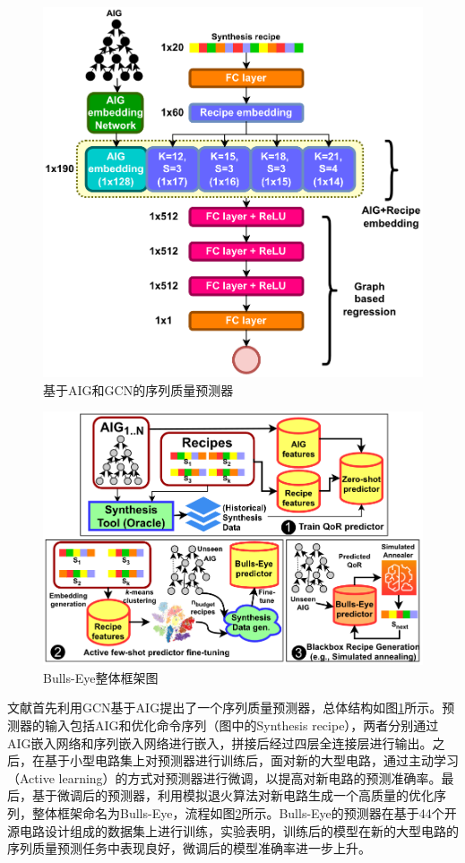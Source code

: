 \begin{figure}[!htbp]
    \centering
    \includegraphics[width=0.7\linewidth]{./figs/LS-Bulls-Eye-QoR_predictor.png}
    \caption{基于AIG和GCN的序列质量预测器}
    \label{LS:Bulls-Eye:Fig:QoR_predictor}
\end{figure}

\begin{figure}[!htbp]
    \centering
    \includegraphics[width=0.9\linewidth]{./figs/LS-Bulls-Eye-overall_framework.png}
    \caption{Bulls-Eye整体框架图}
    \label{LS:Bulls-Eye:Fig:overall_framework}
\end{figure}

文献\cite{LS:Bulls-Eye}首先利用GCN基于AIG提出了一个序列质量预测器，总体结构如图\ref{LS:Bulls-Eye:Fig:QoR_predictor}所示。预测器的输入包括AIG和优化命令序列（图中的Synthesis recipe），两者分别通过AIG嵌入网络和序列嵌入网络进行嵌入，拼接后经过四层全连接层进行输出。之后，在基于小型电路集上对预测器进行训练后，面对新的大型电路，通过主动学习（Active learning）的方式对预测器进行微调，以提高对新电路的预测准确率。最后，基于微调后的预测器，利用模拟退火算法对新电路生成一个高质量的优化序列，整体框架命名为Bulls-Eye，流程如图\ref{LS:Bulls-Eye:Fig:overall_framework}所示。Bulls-Eye的预测器在基于44个开源电路设计组成的数据集上进行训练，实验表明，训练后的模型在新的大型电路的序列质量预测任务中表现良好，微调后的模型准确率进一步上升。


